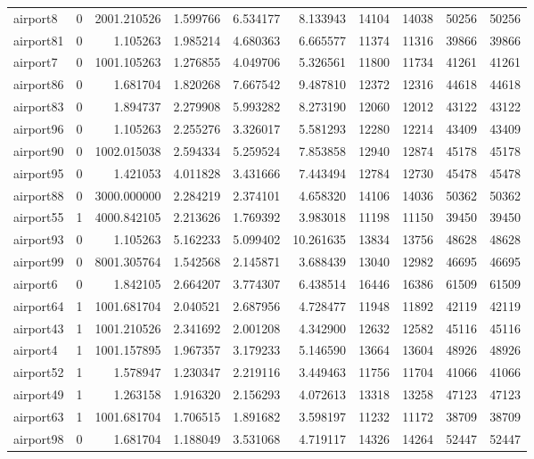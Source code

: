 \begin{longtable}{|l|r|r|r|r|r|r|r|r|r|}
airport8 & 0 & 2001.210526 & 1.599766 & 6.534177 & 8.133943 & 14104 & 14038 & 50256 & 50256 \\
airport81 & 0 & 1.105263 & 1.985214 & 4.680363 & 6.665577 & 11374 & 11316 & 39866 & 39866 \\
airport7 & 0 & 1001.105263 & 1.276855 & 4.049706 & 5.326561 & 11800 & 11734 & 41261 & 41261 \\
airport86 & 0 & 1.681704 & 1.820268 & 7.667542 & 9.487810 & 12372 & 12316 & 44618 & 44618 \\
airport83 & 0 & 1.894737 & 2.279908 & 5.993282 & 8.273190 & 12060 & 12012 & 43122 & 43122 \\
airport96 & 0 & 1.105263 & 2.255276 & 3.326017 & 5.581293 & 12280 & 12214 & 43409 & 43409 \\
airport90 & 0 & 1002.015038 & 2.594334 & 5.259524 & 7.853858 & 12940 & 12874 & 45178 & 45178 \\
airport95 & 0 & 1.421053 & 4.011828 & 3.431666 & 7.443494 & 12784 & 12730 & 45478 & 45478 \\
airport88 & 0 & 3000.000000 & 2.284219 & 2.374101 & 4.658320 & 14106 & 14036 & 50362 & 50362 \\
airport55 & 1 & 4000.842105 & 2.213626 & 1.769392 & 3.983018 & 11198 & 11150 & 39450 & 39450 \\
airport93 & 0 & 1.105263 & 5.162233 & 5.099402 & 10.261635 & 13834 & 13756 & 48628 & 48628 \\
airport99 & 0 & 8001.305764 & 1.542568 & 2.145871 & 3.688439 & 13040 & 12982 & 46695 & 46695 \\
airport6 & 0 & 1.842105 & 2.664207 & 3.774307 & 6.438514 & 16446 & 16386 & 61509 & 61509 \\
airport64 & 1 & 1001.681704 & 2.040521 & 2.687956 & 4.728477 & 11948 & 11892 & 42119 & 42119 \\
airport43 & 1 & 1001.210526 & 2.341692 & 2.001208 & 4.342900 & 12632 & 12582 & 45116 & 45116 \\
airport4 & 1 & 1001.157895 & 1.967357 & 3.179233 & 5.146590 & 13664 & 13604 & 48926 & 48926 \\
airport52 & 1 & 1.578947 & 1.230347 & 2.219116 & 3.449463 & 11756 & 11704 & 41066 & 41066 \\
airport49 & 1 & 1.263158 & 1.916320 & 2.156293 & 4.072613 & 13318 & 13258 & 47123 & 47123 \\
airport63 & 1 & 1001.681704 & 1.706515 & 1.891682 & 3.598197 & 11232 & 11172 & 38709 & 38709 \\
airport98 & 0 & 1.681704 & 1.188049 & 3.531068 & 4.719117 & 14326 & 14264 & 52447 & 52447 \\

\end{longtable}
